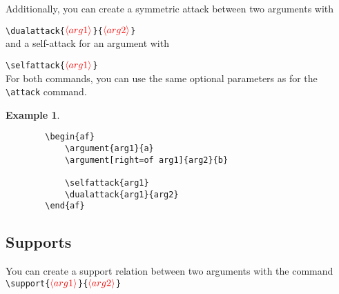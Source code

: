 \documentclass{article}
\newcommand{\opt}[2][red]{\ensuremath{\textcolor{#1}{\langle #2\rangle}}}
\newtheorem{example}{Example}
\begin{document}
    Additionally, you can create a symmetric attack between two arguments with

    \noindent
    \verb|\dualattack{|\opt{arg1}\verb|}{|\opt{arg2}\verb|}|\\

    \noindent
    and a self-attack for an argument with

    \noindent
    \verb|\selfattack{|\opt{arg1}\verb|}|\\

    \noindent
    For both commands, you can use the same optional parameters as for the \verb|\attack| command.

    \begin{example}~
    \begin{verbatim}
        \begin{af}
            \argument{arg1}{a}
            \argument[right=of arg1]{arg2}{b}
    
            \selfattack{arg1}
            \dualattack{arg1}{arg2}
        \end{af}    
    \end{verbatim}

    \begin{center}
        \begin{af}
    
        \end{af}
    \end{center}
    \end{example}
    

\subsection{Supports}
    You can create a support relation between two arguments with the command\\

    \noindent
    \verb|\support{|\opt{arg1}\verb|}{|\opt{arg2}\verb|}|
\end{document}

